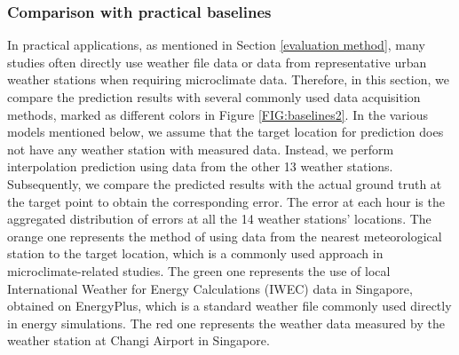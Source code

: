 \documentclass[a4paper,fleqn]{cas-sc}
\begin{document}




\subsubsection{Comparison with practical baselines}\label{level2baseline}

In practical applications, as mentioned in Section \ref{evaluation method}, many studies often directly use weather file data or data from representative urban weather stations when requiring microclimate data. Therefore, in this section, we compare the prediction results with several commonly used data acquisition methods, marked as different colors in Figure \ref{FIG:baselines2}. In the various models mentioned below, we assume that the target location for prediction does not have any weather station with measured data. Instead, we perform interpolation prediction using data from the other 13 weather stations. Subsequently, we compare the predicted results with the actual ground truth at the target point to obtain the corresponding error. The error at each hour is the aggregated distribution of errors at all the 14 weather stations' locations. The orange one represents the method of using data from the nearest meteorological station to the target location, which is a commonly used approach in microclimate-related studies. The green one represents the use of local International Weather for Energy Calculations (IWEC) data in Singapore, obtained on EnergyPlus, which is a standard weather file commonly used directly in energy simulations. The red one represents the weather data measured by the weather station at Changi Airport in Singapore.
\end{document}
